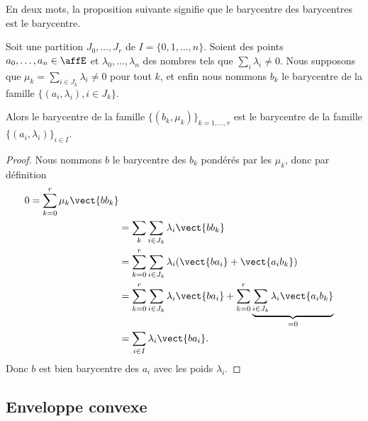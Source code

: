 En deux mots, la proposition suivante signifie que le barycentre des barycentres est le barycentre.
\begin{proposition}        \label{PropSFvjFZb}
	Soit une partition \( J_0, \ldots, J_r\) de \( I=\{ 0,1,\ldots, n \}\). Soient des points \( a_0,\ldots, a_n\in \affE\) et \( \lambda_0,\ldots, \lambda_n\) des nombres tels que \( \sum_i\lambda_i\neq 0\). Nous supposons que \( \mu_k=\sum_{i\in J_k}\lambda_i\neq 0\) pour tout \( k\), et enfin nous nommons \( b_k\) le barycentre de la famille \( \{ (a_i,\lambda_i),i\in J_k \}\).

	Alors le barycentre de la famille \( \{ (b_k,\mu_k) \}_{k=1,\ldots, r}\) est le barycentre de la famille \( \{ (a_i,\lambda_i) \}_{i\in I}\).
\end{proposition}

\begin{proof}
	Nous nommons \( b\) le barycentre des \( b_k\) pondérés par les \( \mu_k\), donc par définition
	\begin{subequations}
		\begin{align}
			0=\sum_{k=0}^r\mu_k\vect{ bb_k }                                                                                              \\
			 & =\sum_{k}\sum_{i\in J_k}\lambda_i\vect{ bb_k }                                                                             \\
			 & =\sum_{k=0}^r\sum_{i\in J_k}\lambda_i(\vect{ ba_i }+\vect{ a_ib_k })                                                       \\
			 & =\sum_{k=0}^r\sum_{i\in J_k}\lambda_i\vect{ ba_i }  +\sum_{k=0}^r\underbrace{\sum_{i\in J_k}\lambda_i\vect{ a_ib_k }}_{=0} \\
			 & =\sum_{i\in I}\lambda_i\vect{ ba_i }.
		\end{align}
	\end{subequations}
	Donc \( b\) est bien barycentre des \( a_i\) avec les poids \( \lambda_i\).
\end{proof}

\subsection{Enveloppe convexe}

